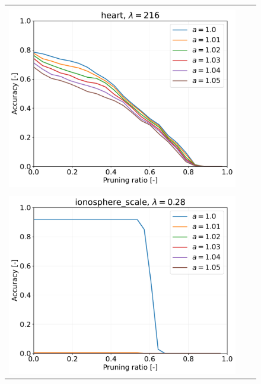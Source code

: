 \begin{figure}[H]
\begin{tabular}{ccc}
		\begin{minipage}[b]{0.3\hsize}\centering {\small Dataset: heart, $\lambda=n$}\\\includegraphics[width=0.8\hsize]{fig/heart/kernel_ss_screening_rate_lam216_x_n_y_etest.pdf}\end{minipage}
		\\
		\begin{minipage}[b]{0.3\hsize}\centering {\small Dataset: ionosphere, $\lambda=n \cdot 10^{-3}$}\\\includegraphics[width=0.8\hsize]{fig/ionosphere/kernel_ss_screening_rate_lam0.28_x_n_y_etest.pdf}\end{minipage}
		&

\end{tabular}
\end{figure}
